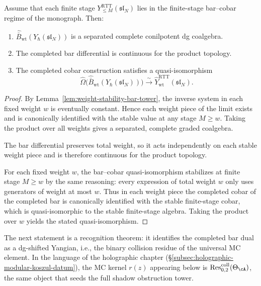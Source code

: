 \begin{theorem}
\ClaimStatusProvedHere
\label{thm:weightwise-MC4-principal-RTT}
Assume that each finite stage
$Y^{\mathrm{RTT}}_{\le M}(\mathfrak{sl}_N)$ lies in the finite-stage
bar--cobar regime of the monograph.  Then:
\begin{enumerate}
    \item $\widehat{\bar B}_{\mathrm{wt}}(Y_\hbar(\mathfrak{sl}_N))$ is a
    separated complete conilpotent dg coalgebra.
    \item The completed bar differential is continuous for the product
    topology.
    \item The completed cobar construction satisfies a quasi-isomorphism
    \begin{equation}
    \widehat\Omega\Big(
    \widehat{\bar B}_{\mathrm{wt}}(Y_\hbar(\mathfrak{sl}_N))
    \Big)
    \xrightarrow{\sim}
    \widehat Y^{\mathrm{RTT}}_{\mathrm{wt}}(\mathfrak{sl}_N).
    \end{equation}
\end{enumerate}
\end{theorem}

\begin{proof}
By Lemma~\ref{lem:weight-stability-bar-tower}, the inverse system in each
fixed weight $w$ is eventually constant.  Hence each weight piece of the
limit exists and is canonically identified with the stable value at any
stage $M\ge w$.  Taking the product over all weights gives a separated,
complete graded coalgebra.

The bar differential preserves total weight, so it acts independently on
each stable weight piece and is therefore continuous for the product
topology.

For each fixed weight $w$, the bar--cobar quasi-isomorphism stabilizes at
finite stage $M\ge w$ by the same reasoning: every expression of total
weight $w$ only uses generators of weight at most $w$.  Thus in each
weight piece the completed cobar of the completed bar is canonically
identified with the stable finite-stage cobar, which is quasi-isomorphic
to the stable finite-stage algebra.  Taking the product over $w$ yields
the stated quasi-isomorphism.
\end{proof}

The next statement is a recognition theorem: it identifies the
completed bar dual as a dg-shifted Yangian, i.e., the binary collision
residue of the universal MC element.  In the language of the holographic
chapter (\S\ref{subsec:holographic-modular-koszul-datum}), the
MC kernel $r(z)$ appearing below is
$\operatorname{Res}^{\mathrm{coll}}_{0,2}(\Theta_\cA)$, the same
object that seeds the full shadow obstruction tower.

